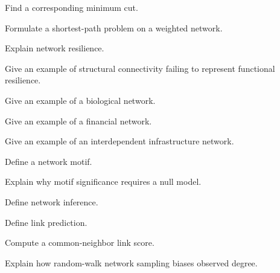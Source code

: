 \begin{exercise}[3]
Find a corresponding minimum cut.
\end{exercise}

\begin{exercise}[2]
Formulate a shortest-path problem on a weighted network.
\end{exercise}

\begin{exercise}[3]
Explain network resilience.
\end{exercise}

\begin{exercise}[3]
Give an example of structural connectivity failing to represent functional
resilience.
\end{exercise}

\begin{exercise}[2]
Give an example of a biological network.
\end{exercise}

\begin{exercise}[2]
Give an example of a financial network.
\end{exercise}

\begin{exercise}[2]
Give an example of an interdependent infrastructure network.
\end{exercise}

\begin{exercise}[2]
Define a network motif.
\end{exercise}

\begin{exercise}[3]
Explain why motif significance requires a null model.
\end{exercise}

\begin{exercise}[2]
Define network inference.
\end{exercise}

\begin{exercise}[2]
Define link prediction.
\end{exercise}

\begin{exercise}[2]
Compute a common-neighbor link score.
\end{exercise}

\begin{exercise}[3]
Explain how random-walk network sampling biases observed degree.
\end{exercise}

